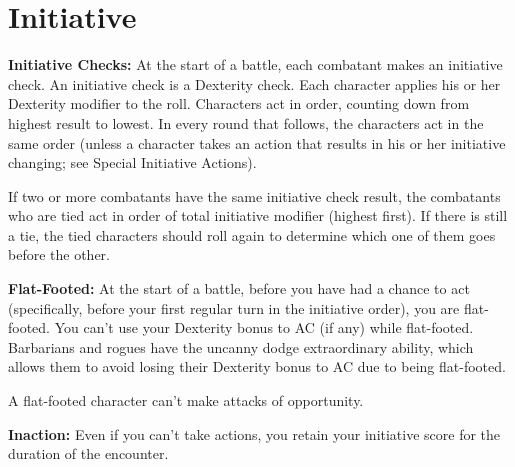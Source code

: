\section{Initiative}

\textbf{Initiative Checks:} At the start of a battle, each combatant makes an initiative check. An initiative check is a Dexterity check. Each character applies his or her Dexterity modifier to the roll. Characters act in order, counting down from highest result to lowest. In every round that follows, the characters act in the same order (unless a character takes an action that results in his or her initiative changing; see Special Initiative Actions).

If two or more combatants have the same initiative check result, the combatants who are tied act in order of total initiative modifier (highest first). If there is still a tie, the tied characters should roll again to determine which one of them goes before the other.

\textbf{Flat-Footed:} At the start of a battle, before you have had a chance to act (specifically, before your first regular turn in the initiative order), you are flat-footed. You can't use your Dexterity bonus to AC (if any) while flat-footed. Barbarians and rogues have the uncanny dodge extraordinary ability, which allows them to avoid losing their Dexterity bonus to AC due to being flat-footed.

A flat-footed character can't make attacks of opportunity.

\textbf{Inaction:} Even if you can't take actions, you retain your initiative score for the duration of the encounter.

